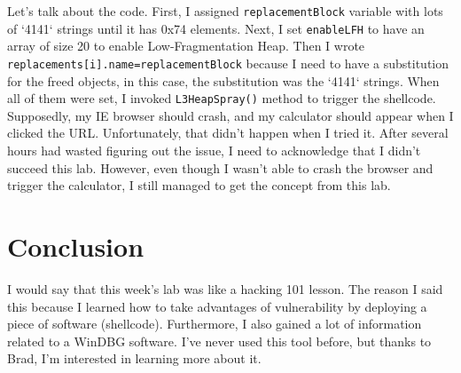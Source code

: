 \documentclass[letterpaper,10pt,titlepage,draftclsnofoot,onecolumn]{IEEEtran}
\begin{document}
Let's talk about the code. 
First, I assigned \verb|replacementBlock| variable with lots of `4141` strings until it has 0x74 elements.
Next, I set \verb|enableLFH| to have an array of size 20 to enable Low-Fragmentation Heap.
Then I wrote \verb|replacements[i].name=replacementBlock| because I need to have a substitution for the freed objects, in this case, the substitution was the `4141` strings.
When all of them were set, I invoked \verb|L3HeapSpray()| method to trigger the shellcode. 
Supposedly, my IE browser should crash, and my calculator should appear when I clicked the URL.
Unfortunately, that didn't happen when I tried it.
After several hours had wasted figuring out the issue, I need to acknowledge that I didn't succeed this lab.
However, even though I wasn't able to crash the browser and trigger the calculator, I still managed to get the concept from this lab.

\section{Conclusion}
I would say that this week's lab was like a hacking 101 lesson. 
The reason I said this because I learned how to take advantages of vulnerability by deploying a piece of software (shellcode).
Furthermore, I also gained a lot of information related to a WinDBG software. 
I've never used this tool before, but thanks to Brad, I'm interested in learning more about it.
\end{document}
